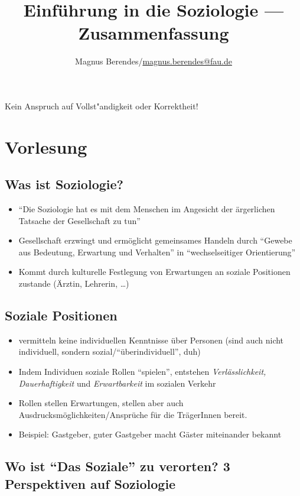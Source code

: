 \documentclass[a4paper, 12pt]{scrartcl}
\newcommand{\Romann}[1]{\uppercase\expandafter{\romannumeral#1}}
\begin{document}
\title{Einführung in die Soziologie --- Zusammenfassung}
\author{Magnus Berendes/\href{mailto:magnus.berendes@fau.de}{magnus.berendes@fau.de}}
\maketitle

{ Kein Anspruch auf Vollst"andigkeit oder Korrektheit!}

\tableofcontents
\newpage
\section{Vorlesung \Romann{1}}
\subsection{Was ist Soziologie?}
\begin{itemize}
	\item
\enquote{Die Soziologie hat es mit dem Menschen im Angesicht der ärgerlichen Tatsache der Gesellschaft zu tun}
\item
	Gesellschaft erzwingt und ermöglicht gemeinsames Handeln durch \enquote{Gewebe aus Bedeutung, Erwartung und Verhalten} in \enquote{wechselseitiger Orientierung}
\item
	Kommt durch kulturelle Festlegung von Erwartungen an soziale Positionen zustande (Ärztin, Lehrerin, \dots)
\end{itemize}
\subsection{Soziale Positionen}
\begin{itemize}
	\item
		vermitteln keine individuellen Kenntnisse über Personen (sind auch nicht individuell, sondern sozial/\enquote{überindividuell}, duh)
	\item
		Indem Individuen soziale Rollen \enquote{spielen}, entstehen \textit{Verlässlichkeit, Dauerhaftigkeit} und \textit{Erwartbarkeit} im sozialen Verkehr
	\item
		Rollen stellen Erwartungen, stellen aber auch Ausdrucksmöglichkeiten/Ansprüche für die TrägerInnen bereit.
	\item
		Beispiel: Gastgeber, guter Gastgeber macht Gäster miteinander bekannt
\end{itemize}

\subsection{Wo ist \enquote{Das Soziale} zu verorten? 3 Perspektiven auf Soziologie}
\end{document}
